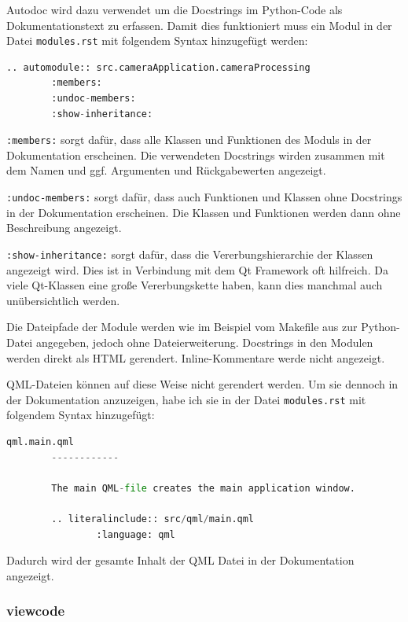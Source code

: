 Autodoc wird dazu verwendet um die Docstrings im Python-Code als Dokumentationstext zu erfassen.
Damit dies funktioniert muss ein Modul in der Datei \verb|modules.rst| mit folgendem Syntax hinzugefügt werden:

\begin{lstlisting}[language = python,label={lst:sphinxAutomodule}]
.. automodule:: src.cameraApplication.cameraProcessing
        :members:
        :undoc-members:
        :show-inheritance:
\end{lstlisting}

\verb|:members:| sorgt dafür, dass alle Klassen und Funktionen des Moduls in der Dokumentation erscheinen.
Die verwendeten Docstrings wirden zusammen mit dem Namen und ggf. Argumenten und Rückgabewerten angezeigt.

\verb|:undoc-members:| sorgt dafür, dass auch Funktionen und Klassen ohne Docstrings in der Dokumentation erscheinen.
Die Klassen und Funktionen werden dann ohne Beschreibung angezeigt.

\verb|:show-inheritance:| sorgt dafür, dass die Vererbungshierarchie der Klassen angezeigt wird.
Dies ist in Verbindung mit dem Qt Framework oft hilfreich. Da viele Qt-Klassen eine große Vererbungskette haben, kann dies manchmal auch unübersichtlich werden.

Die Dateipfade der Module werden wie im Beispiel vom Makefile aus zur Python-Datei angegeben, jedoch ohne Dateierweiterung.
Docstrings in den Modulen werden direkt als HTML gerendert.
Inline-Kommentare werde nicht angezeigt.

QML-Dateien können auf diese Weise nicht gerendert werden. Um sie dennoch in der Dokumentation anzuzeigen,
habe ich sie in der Datei \verb|modules.rst| mit folgendem Syntax hinzugefügt:

\begin{lstlisting}[language = python,label={lst:sphinxQML}]
        qml.main.qml
        ------------
        
        The main QML-file creates the main application window.
        
        .. literalinclude:: src/qml/main.qml
                :language: qml
        \end{lstlisting}
Dadurch wird der gesamte Inhalt der QML Datei in der Dokumentation angezeigt.

\subsubsection{viewcode}


